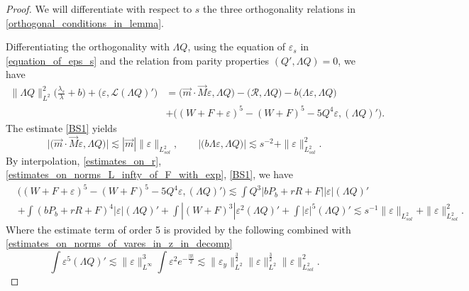 \documentclass[16pt,english, oneside,reqno]{smfart}
\newcommand{\vare}{{\varepsilon}}
\begin{document}
\begin{proof}
    We will differentiate with respect to $s$ the three orthogonality relations in \eqref{orthogonal_conditions_in_lemma}.

    Differentiating the orthogonality with $\Lambda Q$, using the equation of $\vare_s$ in \eqref{equation_of_eps_s} and the relation from parity properties $(Q', \Lambda Q) = 0$, we have
    \begin{equation}
        \begin{split}
            \|\Lambda Q\|^2_{L^2}\Big(\frac{\lambda_s}{\lambda}+b \Big) + \big(\vare, \mathcal{L}(\Lambda Q)'\big) 
            & = 
             \big( \vec{m}\cdot \vec{M}\vare, \Lambda Q\big)
            - \big( \mathcal{R}, \Lambda Q\big) - b \big( \Lambda \vare, \Lambda Q \big)\\ 
            & + \big( (W+F+\vare)^5 - (W+F)^5 - 5Q^4 \vare, (\Lambda Q)'\big).
        \end{split}
    \end{equation}
    The estimate \eqref{BS1} yields
    \begin{equation}
        \big\lvert \big( \vec{m}\cdot \vec{M} \vare, \Lambda Q \big) \big\rvert \lesssim |\vec{m}| \| \vare\|_{L^2_{sol}},  \qquad \big\lvert \big(b \Lambda \vare, \Lambda Q \big)\big\rvert \lesssim s^{-2} + \|\vare\|^{2}_{L^2_{sol}}.
    \end{equation}
    By interpolation, \eqref{estimates_on_r}, \eqref{estimates_on_norms_L_infty_of_F_with_exp}, \eqref{BS1}, we have 
    \begin{equation}\label{estimate_1_in_proof_of_mod_estimates}
        \begin{split}
            & \big( (W+F+\vare)^5 - (W+F)^5 - 5Q^4 \vare, (\Lambda Q)'\big)
            \lesssim \int Q^3 |bP_b + rR + F||\vare| (\Lambda Q)'\\
            & + \int (bP_b + rR + F)^4 |\vare| (\Lambda Q)' + \int |(W+F)^3|\vare^2 (\Lambda Q)' + \int |\vare|^5 (\Lambda Q)'
            \lesssim s^{-1}\|\vare\|_{L^2_{sol}} + \|\vare\|^2_{L^2_{sol}}.
        \end{split}
    \end{equation}
    Where the estimate term of order 5 is provided by the following combined with \eqref{estimates_on_norms_of_vares_in_z_in_decomp}
    \begin{equation}
        \int \vare^5 (\Lambda Q)' \lesssim \|\vare \|^3_{L^{\infty}}\int \vare^{2}e^{-\frac{|y|}{2}}\lesssim \|\vare_y\|^{\frac{3}{2}}_{L^2}\|\vare\|^{\frac{3}{2}}_{L^2}\| \vare\|^2_{L^2_{sol}}.
    \end{equation}
    

\end{proof}
\end{document}
